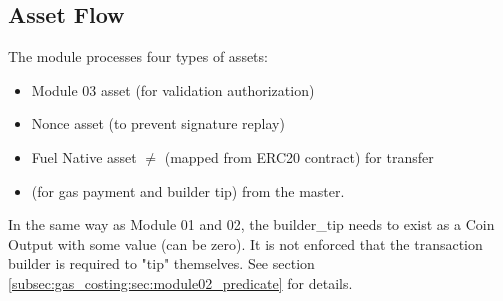 \subsection{Asset Flow}
The module processes four types of assets:
\begin{itemize}
    \item Module 03 asset (for validation authorization)
    \item Nonce asset (to prevent signature replay)
    \item Fuel Native asset $\neq$  (mapped from ERC20 contract) for transfer
    \item {} (for gas payment and builder tip) from the master.
\end{itemize}

In the same way as Module 01 and 02, the builder\_tip needs to exist as a Coin Output with some value (can be zero). It is not enforced that the transaction builder
is required to "tip" themselves. See section \ref{subsec:gas_costing:sec:module02_predicate} for details.


